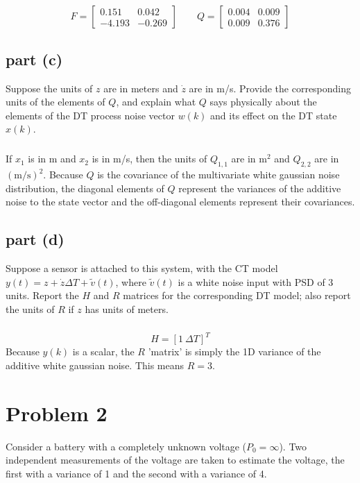 \documentclass[11pt]{article}
\begin{document}
\subparagraph*{}
\begin{equation*}
	F=\begin{bmatrix} 0.151 & 0.042 \\ -4.193 & -0.269 \end{bmatrix} \qquad Q = \begin{bmatrix} 0.004 & 0.009 \\ 0.009 & 0.376 \end{bmatrix}
\end{equation*}

\subsection*{part (c)}
Suppose the units of $z$ are in meters and $\dot{z}$ are in m/s. Provide the corresponding units of the elements of $Q$, and explain what $Q$ says physically about the elements of the DT process noise vector $w(k)$ and its effect on the DT state $x(k)$.

\subparagraph*{}
If $x_1$ is in m and $x_2$ is in m/s, then the units of $Q_{1,1}$ are in $\text{m}^2$ and $Q_{2,2}$ are in $(\text{m/s})^2$. Because $Q$ is the covariance of the multivariate white gaussian noise distribution, the diagonal elements of $Q$ represent the variances of the additive noise to the state vector and the off-diagonal elements represent their covariances.

\subsection*{part (d)}
Suppose a sensor is attached to this system, with the CT model $y(t)=z+\dot{z}\Delta T+\tilde{v}(t)$, where $\tilde{v}(t)$ is a white noise input with PSD of 3 units. Report the $H$ and $R$ matrices for the corresponding DT model; also report the units of $R$ if $z$ has units of meters.

\subparagraph*{}
\begin{equation*}
	H=[1\ \Delta T]^T
\end{equation*}
Because $y(k)$ is a scalar, the $R$ 'matrix' is simply the 1D variance of the additive white gaussian noise. This means $R=3$.

\section*{Problem 2}
Consider a battery with a completely unknown voltage ($P_0=\infty$). Two independent measurements of the voltage are taken to estimate the voltage, the first with a variance of 1 and the second with a variance of 4.
\end{document}
